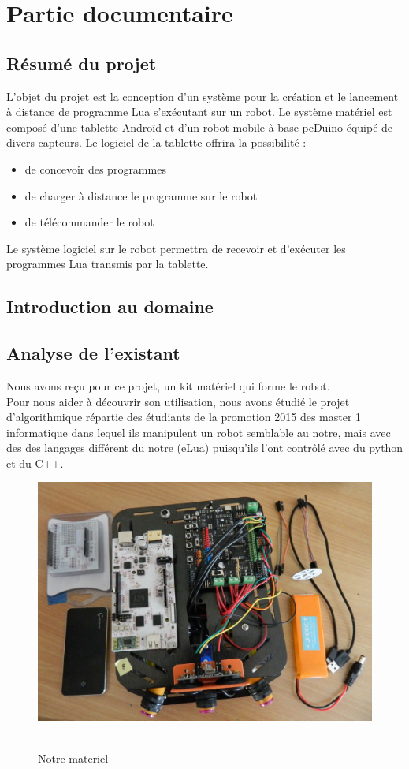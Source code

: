 \documentclass[12pt,francais]{report}
\begin{document}
\chapter*{Partie documentaire}	

\section*{Résumé du projet}	

L’objet du projet est la conception d'un système pour la création et le lancement à distance de programme Lua s'exécutant sur un robot. Le système matériel est composé d'une tablette Androïd et d'un robot mobile à base pcDuino équipé de divers capteurs. Le logiciel de la tablette offrira la possibilité : 
\begin{itemize}
\item de concevoir des programmes
\item de charger à distance le programme sur le robot 
\item de télécommander le robot 
\end{itemize} 
Le système logiciel sur le robot permettra de recevoir et d'exécuter les programmes Lua transmis par la tablette.
		
\newpage 
\section*{Introduction au domaine}

\newpage
\section*{Analyse de l'existant}

Nous avons reçu pour ce projet, un kit matériel qui forme le robot.\\
Pour nous aider à découvrir son utilisation, nous avons étudié le projet d'algorithmique répartie des étudiants de la promotion 2015 des master 1 informatique \cite{ref1} dans lequel ils manipulent un robot semblable au notre, mais avec des des langages différent du notre (eLua) puisqu'ils l'ont contrôlé avec du python et du C++.

\begin{figure}[!h]
\includegraphics[scale=0.4]{./images/notre_materiel.jpg}~\
\caption{Notre materiel}
\end{figure}
	
\end{document}
